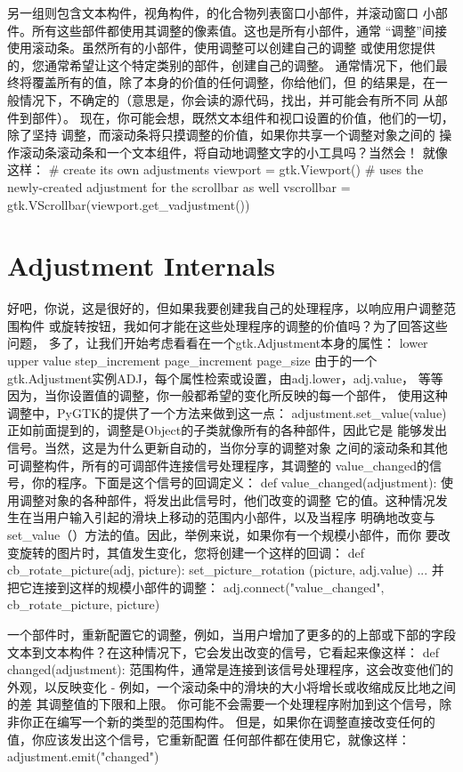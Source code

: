 另一组则包含文本构件，视角构件，的化合物列表窗口小部件，并滚动窗口
小部件。所有这些部件都使用其调整的像素值。这也是所有小部件，通常
“调整”间接使用滚动条。虽然所有的小部件，使用调整可以创建自己的调整
或使用您提供的，您通常希望让这个特定类别的部件，创建自己的调整。
通常情况下，他们最终将覆盖所有的值，除了本身的价值的任何调整，你给他们，但
的结果是，在一般情况下，不确定的（意思是，你会读的源代码，找出，并可能会有所不同
从部件到部件）。
现在，你可能会想，既然文本组件和视口设置的价值，他们的一切，除了坚持
调整，而滚动条将只摸调整的价值，如果你共享一个调整对象之间的
操作滚动条滚动条和一个文本组件，将自动地调整文字的小工具吗？当然会！
就像这样：	
# create its own adjustments
viewport = gtk.Viewport()
# uses the newly-created adjustment for the scrollbar as well
vscrollbar = gtk.VScrollbar(viewport.get_vadjustment())
\section{Adjustment Internals}
好吧，你说，这是很好的，但如果我要创建我自己的处理程序，以响应用户调整范围构件
或旋转按钮，我如何才能在这些处理程序的调整的价值吗？为了回答这些问题，
多了，让我们开始考虑看看在一个gtk.Adjustment本身的属性：	
lower
upper
value
step_increment
page_increment
page_size
由于的一个gtk.Adjustment实例ADJ，每个属性检索或设置，由adj.lower，adj.value，
等等
因为，当你设置值的调整，你一般都希望的变化所反映的每一个部件，
使用这种调整中，PyGTK的提供了一个方法来做到这一点：	
adjustment.set_value(value)
正如前面提到的，调整是Object的子类就像所有的各种部件，因此它是
能够发出信号。当然，这是为什么更新自动的，当你分享的调整对象
之间的滚动条和其他可调整构件，所有的可调部件连接信号处理程序，其调整的
value_changed的信号，你的程序。下面是这个信号的回调定义：	
def value_changed(adjustment):
使用调整对象的各种部件，将发出此信号时，他们改变的调整
它的值。这种情况发生在当用户输入引起的滑块上移动的范围内小部件，以及当程序
明确地改变与set_value（）方法的值。因此，举例来说，如果你有一个规模小部件，而你
要改变旋转的图片时，其值发生变化，您将创建一个这样的回调：
def cb_rotate_picture(adj, picture):
set_picture_rotation (picture, adj.value)
...
并把它连接到这样的规模小部件的调整：
adj.connect("value_changed", cb_rotate_picture, picture)

一个部件时，重新配置它的调整，例如，当用户增加了更多的的上部或下部的字段
文本到文本构件？在这种情况下，它会发出改变的信号，它看起来像这样：	
def changed(adjustment):
范围构件，通常是连接到该信号处理程序，这会改变他们的外观，以反映变化 - 
例如，一个滚动条中的滑块的大小将增长或收缩成反比地之间的差
其调整值的下限和上限。
你可能不会需要一个处理程序附加到这个信号，除非你正在编写一个新的类型的范围构件。
但是，如果你在调整直接改变任何的值，你应该发出这个信号，它重新配置
任何部件都在使用它，就像这样：
adjustment.emit("changed")


